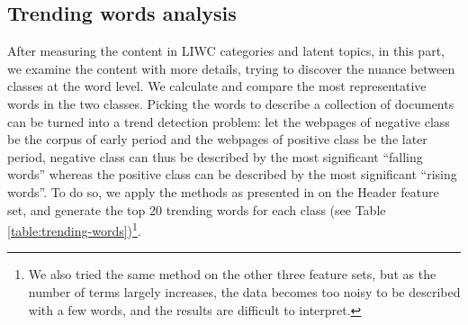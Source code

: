 \documentclass[phd,tocprelim]{cornell}
\begin{document}
\subsection{Trending words analysis}
After measuring the content in LIWC categories and latent topics, in this part, we examine the content with more details, trying to discover the nuance between classes at the word level. We calculate and compare the most representative words in the two classes. Picking the words to describe a collection of documents can be turned into a trend detection problem: let the webpages of negative class be the corpus of early period and the webpages of positive class be the later period, negative class can thus be described by the most significant ``falling words'' whereas the positive class can be described by the most significant ``rising words''.  To do so, we apply the methods as presented in \cite{Kleinberg:2004} on the Header feature set, and generate the top 20 trending words for each class (see Table \ref{table:trending-words})\footnote{We also tried the same method on the other three feature sets, but as the number of terms largely increases, the data becomes too noisy to be described with a few words, and the results are difficult to interpret.}. 
\end{document}

